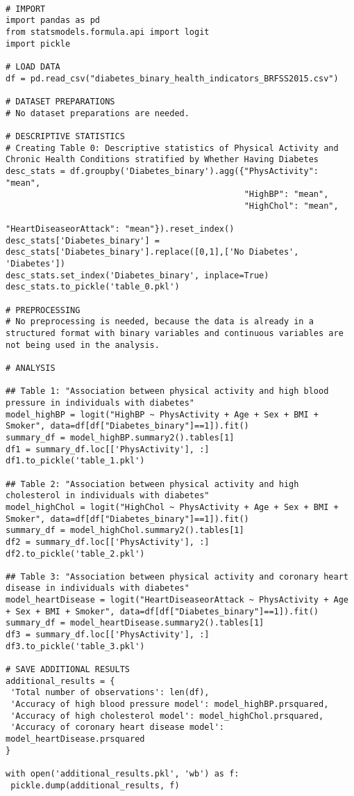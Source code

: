 \documentclass[11pt]{article}
\begin{document}
\begin{verbatim}

# IMPORT
import pandas as pd
from statsmodels.formula.api import logit
import pickle

# LOAD DATA
df = pd.read_csv("diabetes_binary_health_indicators_BRFSS2015.csv")

# DATASET PREPARATIONS
# No dataset preparations are needed.

# DESCRIPTIVE STATISTICS
# Creating Table 0: Descriptive statistics of Physical Activity and Chronic Health Conditions stratified by Whether Having Diabetes
desc_stats = df.groupby('Diabetes_binary').agg({"PhysActivity": "mean", 
                                                "HighBP": "mean",
                                                "HighChol": "mean",
                                                "HeartDiseaseorAttack": "mean"}).reset_index()
desc_stats['Diabetes_binary'] = desc_stats['Diabetes_binary'].replace([0,1],['No Diabetes', 'Diabetes'])
desc_stats.set_index('Diabetes_binary', inplace=True)
desc_stats.to_pickle('table_0.pkl')

# PREPROCESSING 
# No preprocessing is needed, because the data is already in a structured format with binary variables and continuous variables are not being used in the analysis.

# ANALYSIS

## Table 1: "Association between physical activity and high blood pressure in individuals with diabetes"
model_highBP = logit("HighBP ~ PhysActivity + Age + Sex + BMI + Smoker", data=df[df["Diabetes_binary"]==1]).fit()
summary_df = model_highBP.summary2().tables[1]
df1 = summary_df.loc[['PhysActivity'], :]
df1.to_pickle('table_1.pkl')

## Table 2: "Association between physical activity and high cholesterol in individuals with diabetes"
model_highChol = logit("HighChol ~ PhysActivity + Age + Sex + BMI + Smoker", data=df[df["Diabetes_binary"]==1]).fit()
summary_df = model_highChol.summary2().tables[1]
df2 = summary_df.loc[['PhysActivity'], :]
df2.to_pickle('table_2.pkl')

## Table 3: "Association between physical activity and coronary heart disease in individuals with diabetes"
model_heartDisease = logit("HeartDiseaseorAttack ~ PhysActivity + Age + Sex + BMI + Smoker", data=df[df["Diabetes_binary"]==1]).fit()
summary_df = model_heartDisease.summary2().tables[1]
df3 = summary_df.loc[['PhysActivity'], :]
df3.to_pickle('table_3.pkl')

# SAVE ADDITIONAL RESULTS
additional_results = {
 'Total number of observations': len(df),
 'Accuracy of high blood pressure model': model_highBP.prsquared,
 'Accuracy of high cholesterol model': model_highChol.prsquared,
 'Accuracy of coronary heart disease model': model_heartDisease.prsquared
}

with open('additional_results.pkl', 'wb') as f:
 pickle.dump(additional_results, f)

\end{verbatim}
\end{document}
